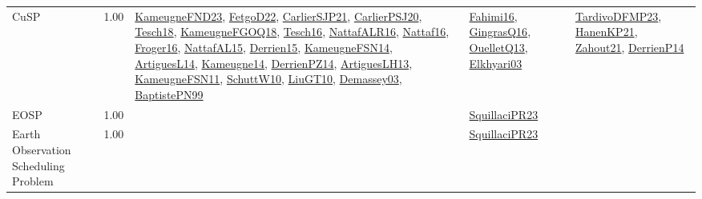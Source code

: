 {\begin{longtable}{p{3cm}r>{\raggedright\arraybackslash}p{6cm}>{\raggedright\arraybackslash}p{6cm}>{\raggedright\arraybackslash}p{8cm}}
\index{CuSP}\index{Classification!CuSP}CuSP &  1.00 & \hyperref[detail:KameugneFND23]{KameugneFND23}, \hyperref[detail:FetgoD22]{FetgoD22}, \hyperref[detail:CarlierSJP21]{CarlierSJP21}, \hyperref[detail:CarlierPSJ20]{CarlierPSJ20}, \hyperref[detail:Tesch18]{Tesch18}, \hyperref[detail:KameugneFGOQ18]{KameugneFGOQ18}, \hyperref[detail:Tesch16]{Tesch16}, \hyperref[detail:NattafALR16]{NattafALR16}, \hyperref[detail:Nattaf16]{Nattaf16}, \hyperref[detail:Froger16]{Froger16}, \hyperref[detail:NattafAL15]{NattafAL15}, \hyperref[detail:Derrien15]{Derrien15}, \hyperref[detail:KameugneFSN14]{KameugneFSN14}, \hyperref[detail:ArtiguesL14]{ArtiguesL14}, \hyperref[detail:Kameugne14]{Kameugne14}, \hyperref[detail:DerrienPZ14]{DerrienPZ14}, \hyperref[detail:ArtiguesLH13]{ArtiguesLH13}, \hyperref[detail:KameugneFSN11]{KameugneFSN11}, \hyperref[detail:SchuttW10]{SchuttW10}, \hyperref[detail:LiuGT10]{LiuGT10}, \hyperref[detail:Demassey03]{Demassey03}, \hyperref[detail:BaptistePN99]{BaptistePN99} & \hyperref[detail:Fahimi16]{Fahimi16}, \hyperref[detail:GingrasQ16]{GingrasQ16}, \hyperref[detail:OuelletQ13]{OuelletQ13}, \hyperref[detail:Elkhyari03]{Elkhyari03} & \hyperref[detail:TardivoDFMP23]{TardivoDFMP23}, \hyperref[detail:HanenKP21]{HanenKP21}, \hyperref[detail:Zahout21]{Zahout21}, \hyperref[detail:DerrienP14]{DerrienP14}\\
\index{EOSP}\index{Classification!EOSP}EOSP &  1.00 &  & \hyperref[detail:SquillaciPR23]{SquillaciPR23} & \\
\index{Earth Observation Scheduling Problem}\index{Classification!Earth Observation Scheduling Problem}Earth Observation Scheduling Problem &  1.00 &  & \hyperref[detail:SquillaciPR23]{SquillaciPR23} & \\

\end{longtable}}
